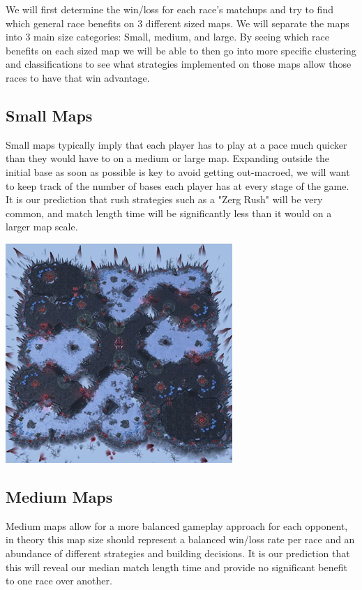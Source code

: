 \documentclass[a4paper,12pt]{report}
\begin{document}
We will first determine the win/loss for each race’s matchups and try to find which general race benefits on 3 different sized maps. We will separate the maps into 3 main size categories: Small, medium, and large. By seeing which race benefits on each sized map we will be able to then go into more specific clustering and classifications to see what strategies implemented on those maps allow those races to have that win advantage.

\subsection{Small Maps}

Small maps typically imply that each player has to play at a pace much quicker than they would have to on a medium or large map. Expanding outside the initial base as soon as possible is key to avoid getting out-macroed, we will want to keep track of the number of bases each player has at every stage of the game. It is our prediction that rush strategies such as a "Zerg Rush" will be very common, and match length time will be significantly less than it would on a larger map scale.

\begin{center}
    \captionsetup{type=figure}
    \includegraphics[width=.5\linewidth]{media/smallmap.png}
\end{center} 

\subsection{Medium Maps}

Medium maps allow for a more balanced gameplay approach for each opponent, in theory this map size should represent a balanced win/loss rate per race and an abundance of different strategies and building decisions. It is our prediction that this will reveal our median match length time and provide no significant benefit to one race over another.
\end{document}
